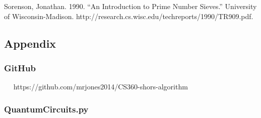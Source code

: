 \documentclass[11pt]{article}
\begin{document}
Sorenson, Jonathan. 1990. ``An Introduction to Prime Number Sieves.''
University of Wisconsin-Madison.
http://{}research.cs.wisc.edu/techreports/1990/TR909.pdf.

    \hypertarget{appendix}{%
\subsection{Appendix}\label{appendix}}

    \hypertarget{github}{%
\subsubsection{GitHub}\label{github}}

~~ https://github.com/mrjones2014/CS360-shors-algorithm

    \hypertarget{quantumcircuits.py}{%
\subsubsection{QuantumCircuits.py}\label{quantumcircuits.py}}
\end{document}
